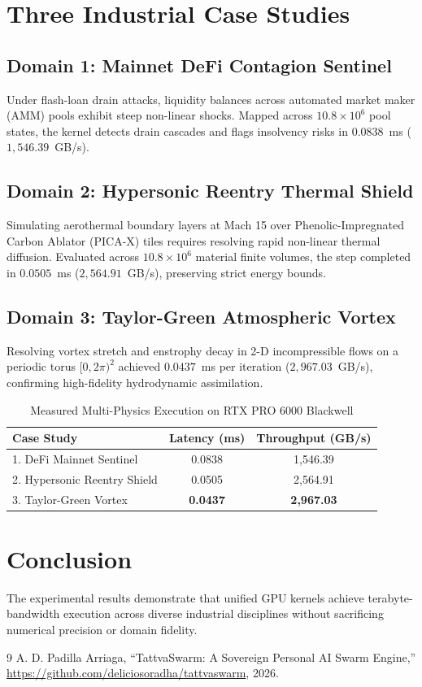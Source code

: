 \documentclass[10pt,twocolumn]{article}
\begin{document}
\section{Three Industrial Case Studies}

\subsection{Domain 1: Mainnet DeFi Contagion Sentinel}
Under flash-loan drain attacks, liquidity balances across automated market maker (AMM) pools exhibit steep non-linear shocks. Mapped across $10.8\times 10^6$ pool states, the kernel detects drain cascades and flags insolvency risks in $\mathbf{0.0838}$~ms ($1,546.39$~GB/s).

\subsection{Domain 2: Hypersonic Reentry Thermal Shield}
Simulating aerothermal boundary layers at Mach 15 over Phenolic-Impregnated Carbon Ablator (PICA-X) tiles requires resolving rapid non-linear thermal diffusion. Evaluated across $10.8\times 10^6$ material finite volumes, the step completed in $\mathbf{0.0505}$~ms ($2,564.91$~GB/s), preserving strict energy bounds.

\subsection{Domain 3: Taylor-Green Atmospheric Vortex}
Resolving vortex stretch and enstrophy decay in 2-D incompressible flows on a periodic torus $[0, 2\pi)^2$ achieved $\mathbf{0.0437}$~ms per iteration ($2,967.03$~GB/s), confirming high-fidelity hydrodynamic assimilation.

\begin{table}[h]
\centering
\small
\caption{Measured Multi-Physics Execution on RTX PRO 6000 Blackwell}
\label{tab:triple_perf}
\begin{tabular}{lcc}
\toprule
\textbf{Case Study} & \textbf{Latency (ms)} & \textbf{Throughput (GB/s)} \\
\midrule
1. DeFi Mainnet Sentinel & 0.0838 & 1,546.39 \\
2. Hypersonic Reentry Shield & 0.0505 & 2,564.91 \\
3. Taylor-Green Vortex & \textbf{0.0437} & \textbf{2,967.03} \\
\bottomrule
\end{tabular}
\end{table}

\section{Conclusion}
The experimental results demonstrate that unified GPU kernels achieve terabyte-bandwidth execution across diverse industrial disciplines without sacrificing numerical precision or domain fidelity.

\begin{thebibliography}{9}
A. D. Padilla Arriaga, ``TattvaSwarm: A Sovereign Personal AI Swarm Engine,'' \url{https://github.com/deliciosoradha/tattvaswarm}, 2026.
\end{thebibliography}
\end{document}
